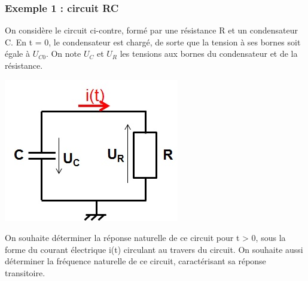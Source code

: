 	\subsubsection{Exemple 1 : circuit RC}
		
	\begin{minipage}[l]{0.7\linewidth}
		On considère le circuit ci-contre, formé par une résistance R et un condensateur C. En t = 0, le condensateur est chargé, de sorte que la tension à ses bornes soit égale à $U_{C0}$. On note $U_{C}$ et $U_{R}$ les tensions aux bornes du condensateur et de la résistance. 	
	\end{minipage} \hfill
	\begin{minipage}[r]{0.4\linewidth}
		\includegraphics[scale=0.5]{images/circuit_RC_reponse_naturelle.jpg} 	
	\end{minipage}
	\vspace{0.5\baselineskip}
	On souhaite déterminer la réponse naturelle de ce circuit pour t > 0, sous la forme du courant électrique i(t) circulant au travers du circuit. On souhaite aussi déterminer la fréquence naturelle de ce circuit, caractérisant sa réponse transitoire.
	
